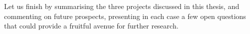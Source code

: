Let us finish by summarising the three projects discussed in this thesis, and commenting on future prospects, presenting in each case a few open questions that could provide a fruitful avenue for further research.




